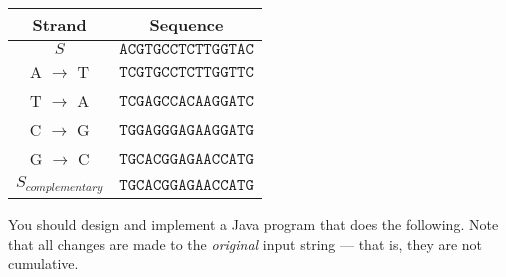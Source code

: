 \documentclass[11pt]{article}
\begin{document}
\begin{center}

\begin{tabular}{|cc|}
\hline
\textbf{Strand} & \textbf{Sequence}\\
\hline\hline
$S$      & $\mathtt{ACGTGCCTCTTGGTAC}$ \\
\hline
A $\to$ T &  $\mathtt{TCGTGCCTCTTGGTTC}$ \\
T $\to$ A &  $\mathtt{TCGAGCCACAAGGATC}$ \\
C $\to$ G &  $\mathtt{TGGAGGGAGAAGGATG}$ \\
G $\to$ C &  $\mathtt{TGCACGGAGAACCATG}$ \\
\hline
$S_{complementary}$ &  $\mathtt{TGCACGGAGAACCATG}$ \\
\hline
\end{tabular}
\end{center}

You should design and implement a Java program that does the following.  Note that all changes are made to the {\em
original} input string --- that is, they are not cumulative.
\end{document}
